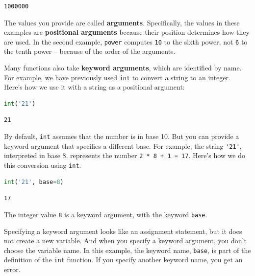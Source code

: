 \begin{lstlisting}[style=output]
1000000
\end{lstlisting}

The values you provide are called \textbf{arguments}. Specifically, the
values in these examples are \textbf{positional arguments} because their
position determines how they are used. In the second example,
\passthrough{\lstinline!power!} computes \passthrough{\lstinline!10!} to
the sixth power, not \passthrough{\lstinline!6!} to the tenth power --
because of the order of the arguments.

Many functions also take \textbf{keyword arguments}, which are
identified by name. For example, we have previously used
\passthrough{\lstinline!int!} to convert a string to an integer. Here's
how we use it with a string as a positional argument:

\begin{lstlisting}[language=Python,style=source]
int('21')
\end{lstlisting}

\begin{lstlisting}[style=output]
21
\end{lstlisting}

By default, \passthrough{\lstinline!int!} assumes that the number is in
base 10. But you can provide a keyword argument that specifies a
different base. For example, the string \passthrough{\lstinline!'21'!},
interpreted in base 8, represents the number
\passthrough{\lstinline!2 * 8 + 1 = 17!}. Here's how we do this
conversion using \passthrough{\lstinline!int!}.

\begin{lstlisting}[language=Python,style=source]
int('21', base=8)
\end{lstlisting}

\begin{lstlisting}[style=output]
17
\end{lstlisting}

The integer value \passthrough{\lstinline!8!} is a keyword argument,
with the keyword \passthrough{\lstinline!base!}.

Specifying a keyword argument looks like an assignment statement, but it
does not create a new variable. And when you specify a keyword argument,
you don't choose the variable name. In this example, the keyword name,
\passthrough{\lstinline!base!}, is part of the definition of the
\passthrough{\lstinline!int!} function. If you specify another keyword
name, you get an error.

